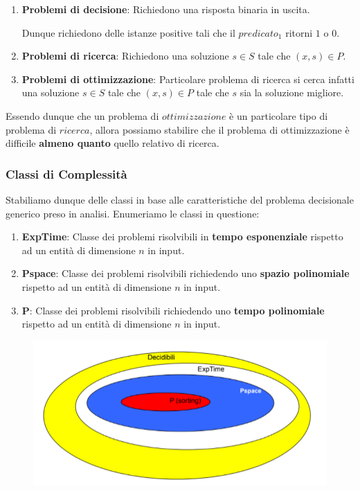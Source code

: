 \documentclass{article}
\begin{document}
\begin{enumerate}
    \item \textbf{Problemi di decisione}: Richiedono una risposta binaria in uscita. 
    
    Dunque richiedono 
    delle istanze positive tali che il $predicato_{1}$ ritorni $1$ o $0$.
    
    \item \textbf{Problemi di ricerca}: Richiedono una soluzione $s \in S$ tale che $(x,s) \in P$.

    \item \textbf{Problemi di ottimizzazione}: Particolare problema di ricerca si cerca infatti una soluzione $s \in S$ tale che $(x,s) \in P$ tale che $s$ sia la soluzione migliore.
\end{enumerate}

Essendo dunque che un problema di $ottimizzazione$ è un particolare tipo di problema di $ricerca$, allora possiamo stabilire che il problema di ottimizzazione è difficile \textbf{almeno quanto} quello relativo di ricerca.

\newpage

\subsubsection{Classi di Complessità} Stabiliamo dunque delle classi in base alle caratteristiche del problema decisionale generico preso in analisi. Enumeriamo le classi in questione:

\begin{enumerate}
    \item \textbf{ExpTime}: Classe dei problemi risolvibili in \textbf{tempo esponenziale} rispetto ad un entità di dimensione $n$ in input.
    \item \textbf{Pspace}: Classe dei problemi risolvibili richiedendo uno \textbf{spazio polinomiale} rispetto ad un entità di dimensione $n$ in input.
    \item \textbf{P}: Classe dei problemi risolvibili richiedendo uno \textbf{tempo polinomiale} rispetto ad un entità di dimensione $n$ in input.
\end{enumerate}

\begin{figure}[htbp]
    \center
    \includegraphics[scale=0.45]{img/classiComplessita.png}
\end{figure}
\end{document}
